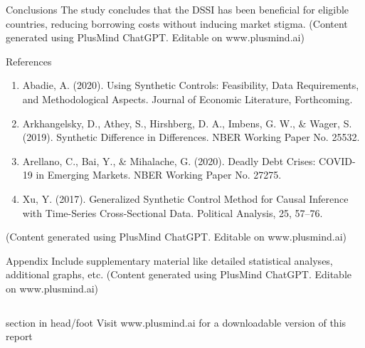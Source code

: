 \documentclass[final]{beamer}
\begin{document}
\begin{frame}[t]
\begin{columns}[T]
\begin{column}{.32\textwidth}
    \vspace{1cm} %

    \begin{block}{\Huge Conclusions} %
    \Large %
    The study concludes that the DSSI has been beneficial for eligible countries, reducing borrowing costs without inducing market stigma. 
    \normalsize (Content generated using PlusMind ChatGPT. Editable on www.plusmind.ai)
    \end{block}

    \vspace{1cm} %

    \begin{block}{\Huge References} %
    \Large %
     \begin{enumerate}
        \item Abadie, A. (2020). Using Synthetic Controls: Feasibility, Data Requirements, and Methodological Aspects. Journal of Economic Literature, Forthcoming.
        \item Arkhangelsky, D., Athey, S., Hirshberg, D. A., Imbens, G. W., & Wager, S. (2019). Synthetic Difference in Differences. NBER Working Paper No. 25532.
        \item Arellano, C., Bai, Y., & Mihalache, G. (2020). Deadly Debt Crises: COVID-19 in Emerging Markets. NBER Working Paper No. 27275.
        \item Xu, Y. (2017). Generalized Synthetic Control Method for Causal Inference with Time-Series Cross-Sectional Data. Political Analysis, 25, 57–76.
    \end{enumerate}
    \normalsize (Content generated using PlusMind ChatGPT. Editable on www.plusmind.ai)
    \end{block}

    \vspace{1cm} %

    \begin{block}{\Huge Appendix} %
    \Large %
    Include supplementary material like detailed statistical analyses, additional graphs, etc.
    \normalsize (Content generated using PlusMind ChatGPT. Editable on www.plusmind.ai)
    \end{block}
\end{column}

\end{columns}
    \vspace{1cm} %
\begin{beamercolorbox}[center]{section in head/foot}
    \Large Visit www.plusmind.ai for a downloadable version of this report
\end{beamercolorbox}

\end{frame}
\end{document}
